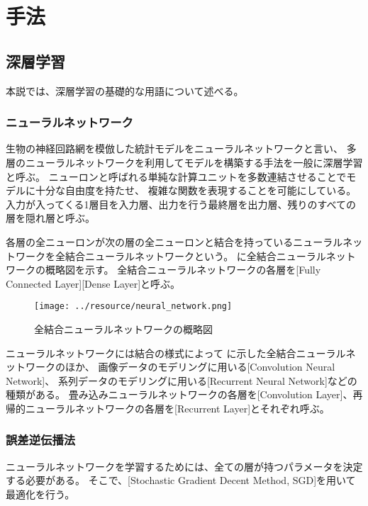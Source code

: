 \chapter{手法}

\section{深層学習}

本説では、深層学習の基礎的な用語について述べる。

\subsection{ニューラルネットワーク}

生物の神経回路網を模倣した統計モデルをニューラルネットワークと言い、
多層のニューラルネットワークを利用してモデルを構築する手法を一般に深層学習と呼ぶ。
ニューロンと呼ばれる単純な計算ユニットを多数連結させることでモデルに十分な自由度を持たせ、
複雑な関数を表現することを可能にしている。
入力が入ってくる1層目を入力層、出力を行う最終層を出力層、残りのすべての層を隠れ層と呼ぶ。

各層の全ニューロンが次の層の全ニューロンと結合を持っているニューラルネットワークを全結合ニューラルネットワークという。
に全結合ニューラルネットワークの概略図を示す。
全結合ニューラルネットワークの各層を[Fully Connected Layer][Dense Layer]と呼ぶ。
\begin{figure}[tbp]
    \centering
    \texttt{[image: ../resource/neural\_network.png]}
    \caption{全結合ニューラルネットワークの概略図} \label{fig:neural_network}
\end{figure}

ニューラルネットワークには結合の様式によって
に示した全結合ニューラルネットワークのほか、
画像データのモデリングに用いる[Convolution Neural Network]、
系列データのモデリングに用いる[Recurrent Neural Network]などの種類がある。
畳み込みニューラルネットワークの各層を[Convolution Layer]、再帰的ニューラルネットワークの各層を[Recurrent Layer]とそれぞれ呼ぶ。

\subsection{誤差逆伝播法}

ニューラルネットワークを学習するためには、全ての層が持つパラメータを決定する必要がある。
そこで、[Stochastic Gradient Decent Method, SGD]を用いて最適化を行う。

